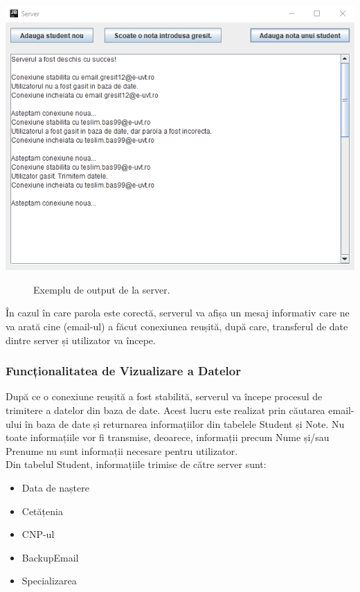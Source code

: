 \documentclass{article}
\begin{document}
	\begin{center}
		\includegraphics[scale=0.7]{Source/ServerOutput}
		\begin{figure}[!h]
			{\caption*{Exemplu de output de la server.}}
		\end{figure}
	\end{center}

		În cazul în care parola este corectă, serverul va afișa un mesaj informativ care ne va arată cine (email-ul) a făcut conexiunea reușită, după care, transferul de date dintre server și utilizator va începe.\\
			\subsubsection{Funcționalitatea de Vizualizare a Datelor}

		După ce o conexiune reușită a fost stabilită, serverul va începe procesul de trimitere a datelor din baza de date. Acest lucru este realizat prin căutarea email-ului în baza de date și returnarea informațiilor din tabelele Student și Note. Nu toate informațiile vor fi transmise, deoarece, informații precum Nume și/sau Prenume nu sunt informații necesare pentru utilizator.\\

	Din tabelul Student, informațiile trimise de către server sunt:
	\begin{itemize}
		\item Data de naștere
		\item Cetățenia
		\item CNP-ul
		\item BackupEmail
		\item Specializarea
	\end{itemize}
\end{document}
